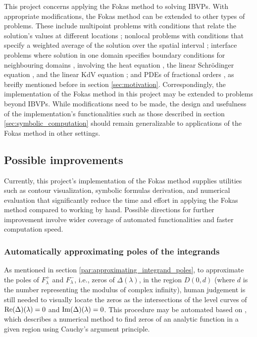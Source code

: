 \documentclass[12pt, oneside, a4paper]{article}
\begin{document}
This project concerns applying the Fokas method to solving IBVPs. With appropriate modifications, the Fokas method can be extended to other types of problems. These include multipoint problems with conditions that relate the solution's values at different locations \cite{Pelloni2018}; nonlocal problems with conditions that specify a weighted average of the solution over the spatial interval \cite{Miller2018}; interface problems where solution in one domain specifies boundary conditions for neighbouring domains \cite{Sheils2015}, involving the heat equation \cite{Sheils2014}\cite{SheilsSmith2015}, the linear Schr\"{o}dinger equation \cite{SheilsDeconinck2015}, and the linear KdV equation \cite{Deconinck2016}; and PDEs of fractional orders \cite{Fernandez2018}, as breifly mentioned before in section \ref{sec:motivation}. Correspondingly, the implementation of the Fokas method in this project may be extended to problems beyond IBVPs. While modifications need to be made, the design and usefulness of the implementation's functionalities such as those described in section \ref{sec:symbolic_computation} should remain generalizable to applications of the Fokas method in other settings.

\subsection{Possible improvements}

Currently, this project's implementation of the Fokas method \cite{Xiao} supplies utilities such as contour visualization, symbolic formulas derivation, and numerical evaluation that significantly reduce the time and effort in applying the Fokas method compared to working by hand. Possible directions for further improvement involve wider coverage of automated functionalities and faster computation speed.

\subsubsection{Automatically approximating poles of the integrands}

As mentioned in section \ref{par:approximating_integrand_poles}, to approximate the poles of $F^+_\lambda$ and $F^-_\lambda$, i.e., zeros of $\Delta(\lambda)$, in the region $D(0,d)$ (where $d$ is the number representing the modulus of complex infinity), human judgement is still needed to visually locate the zeros as the intersections of the level curves of $\mathrm{Re}(\Delta)(\lambda)=0$ and $\mathrm{Im}(\Delta)(\lambda)=0$. This procedure may be automated based on \cite{Delves1967}, which describes a numerical method to find zeros of an analytic function in a given region using Cauchy's argument principle.
\end{document}
